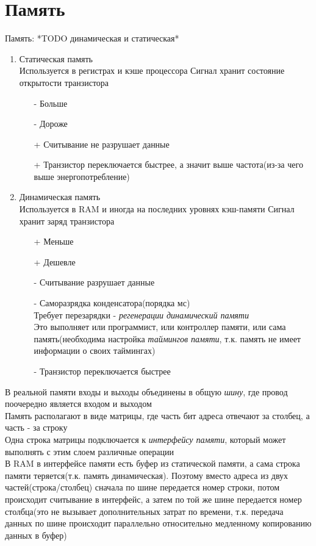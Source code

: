 \documentclass[12pt]{article}
\begin{document}
\section{Память}
Память:
*TODO динамическая и статическая*
\begin{enumerate}
    \item Статическая память\\
    Используется в регистрах и кэше процессора
    Сигнал хранит состояние открытости транзистора
    \begin{enumerate}
        \item[-] Больше
        \item[-] Дороже
        \item[+] Считывание не разрушает данные
        \item[+] Транзистор переключается быстрее, а значит выше частота(из-за чего выше энергопотребление)
     \end{enumerate}
    \item Динамическая память\\
    Используется в RAM и иногда на последних уровнях кэш-памяти
    Сигнал хранит заряд транзистора
    \begin{enumerate}
        \item[+] Меньше
        \item[+] Дешевле
        \item[-] Считывание разрушает данные
        \item[-] Саморазрядка конденсатора(порядка мс)\\
        Требует перезарядки - \textit{регенерации динамический памяти}\\
        Это выполняет или программист, или контроллер памяти, или сама память(необходима настройка \textit{таймингов памяти}, т.к. память не имеет информации о своих таймингах)
        \item[-] Транзистор переключается быстрее
     \end{enumerate}
\end{enumerate}
В реальной памяти входы и выходы объединены в общую \textit{шину}, где провод поочередно является входом и выходом\\
Память располагают в виде матрицы, где часть бит адреса отвечают за столбец, а часть - за строку\\
Одна строка матрицы подключается к \textit{интерфейсу памяти}, который может выполнять с этим слоем различные операции\\
В RAM в интерфейсе памяти есть буфер из статической памяти, а сама строка памяти теряется(т.к. память динамическая). Поэтому вместо адреса из двух частей(строка/столбец) сначала по шине передается номер строки, потом происходит считывание в интерфейс, а затем по той же шине передается номер столбца(это не вызывает дополнительных затрат по времени, т.к. передача данных по шине происходит параллельно относительно медленному копированию данных в буфер)\\\\
\end{document}

